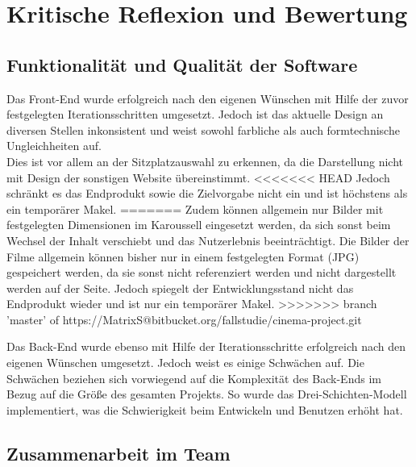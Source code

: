 \section{Kritische Reflexion und Bewertung}
\multipleauthorsection{\authorRF}{\authorEJ}

\subsection{Funktionalität und Qualität der Software}
\authorsection{\authorRF}

Das Front-End wurde erfolgreich nach den eigenen Wünschen mit Hilfe der zuvor festgelegten Iterationsschritten umgesetzt.
Jedoch ist das aktuelle Design an diversen Stellen inkonsistent und weist sowohl farbliche als auch formtechnische Ungleichheiten auf. \\
Dies ist vor allem an der Sitzplatzauswahl zu erkennen, da die Darstellung nicht mit Design der sonstigen Website übereinstimmt.
<<<<<<< HEAD
Jedoch schränkt es das Endprodukt sowie die Zielvorgabe nicht ein und ist höchstens als ein temporärer Makel.
=======
Zudem können allgemein nur Bilder mit festgelegten Dimensionen im Karoussell eingesetzt werden, da sich sonst beim Wechsel der Inhalt verschiebt und das Nutzerlebnis beeinträchtigt.
Die Bilder der Filme allgemein können bisher nur in einem festgelegten Format (JPG) gespeichert werden, da sie sonst nicht referenziert werden und nicht dargestellt werden auf der Seite.
Jedoch spiegelt der Entwicklungsstand nicht das Endprodukt wieder und ist nur ein temporärer Makel.
>>>>>>> branch 'master' of https://MatrixS@bitbucket.org/fallstudie/cinema-project.git

Das Back-End wurde ebenso mit Hilfe der Iterationsschritte erfolgreich nach den eigenen Wünschen umgesetzt.
Jedoch weist es einige Schwächen auf.
Die Schwächen beziehen sich vorwiegend auf die Komplexität des Back-Ends im Bezug auf die Größe des gesamten Projekts.
So wurde das Drei-Schichten-Modell implementiert, was die Schwierigkeit beim Entwickeln und Benutzen erhöht hat.\\

\subsection{Zusammenarbeit im Team}
\multipleauthorsection{\authorRF}{\authorEJ}

